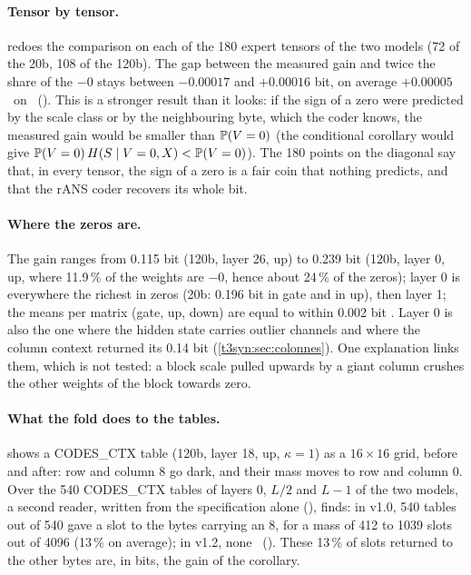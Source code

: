 \begin{figure}[tbp]
\centering
\GrapheCodonTheoreme
{}
\label{fig:t3-codon-theoreme}
\end{figure}

\paragraph{Tensor by tensor.}  redoes the comparison on each of the 180 expert tensors of the two models (72 of the 20b, 108 of the 120b). The gap between the measured gain and twice the share of the $-0$ stays between $-0.00017$ and $+0.00016$ bit, on average $+0.00005$ \calc~on \mes~(). This is a stronger result than it looks: if the sign of a zero were predicted by the scale class or by the neighbouring byte, which the coder knows, the measured gain would be smaller than $\mathbb{P}(V = 0)$ (the conditional corollary would give $\mathbb{P}(V = 0)\,H(S \mid V = 0, X) < \mathbb{P}(V = 0)$). The 180 points on the diagonal say that, in every tensor, the sign of a zero is a fair coin that nothing predicts, and that the rANS coder \parencite{duda2013ans,giesen2014interleaved} recovers its whole bit.

\paragraph{Where the zeros are.} The gain ranges from 0.115 bit (120b, layer 26, up) to 0.239 bit (120b, layer 0, up, where 11.9\,\% of the weights are $-0$, hence about 24\,\% of the zeros); layer 0 is everywhere the richest in zeros (20b: 0.196 bit in gate and in up), then layer 1; the means per matrix (gate, up, down) are equal to within 0.002 bit \mes. Layer 0 is also the one where the hidden state carries outlier channels and where the column context returned its 0.14 bit (\cref{t3syn:sec:colonnes}). One explanation links them, which is not tested: a block scale pulled upwards by a giant column crushes the other weights of the block towards zero.

\begin{figure}[tbp]
\centering
\GrapheCodonOctets
{}
\label{fig:t3-codon-octets}
\end{figure}

\paragraph{What the fold does to the tables.}  shows a CODES\_CTX table (120b, layer 18, up, $\kappa = 1$) as a $16 \times 16$ grid, before and after: row and column 8 go dark, and their mass moves to row and column 0. Over the 540 CODES\_CTX tables of layers 0, $L/2$ and $L - 1$ of the two models, a second reader, written from the specification alone (), finds: in v1.0, 540 tables out of 540 gave a slot to the bytes carrying an 8, for a mass of 412 to \num{1039} slots out of \num{4096} (13\,\% on average); in v1.2, none \mes~(). These 13\,\% of slots returned to the other bytes are, in bits, the gain of the corollary.

